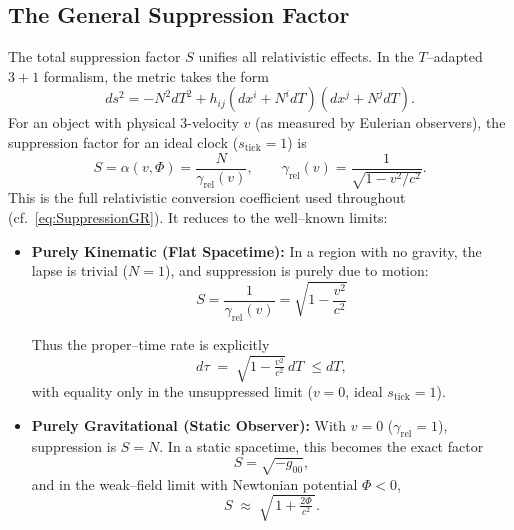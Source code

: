 \documentclass[12pt]{article}
\theoremstyle{plain}
\newcommand{\gammarel}{\gamma_{\!\mathrm{rel}}}
\begin{document}
\subsection{The General Suppression Factor}
The total suppression factor $S$ unifies all relativistic effects. In the $T$–adapted $3{+}1$ formalism, the metric takes the form
\begin{equation}
ds^2 = -N^2 dT^2 + h_{ij}(dx^i + N^i dT)(dx^j + N^j dT).
\label{eq:ADMmetric}
\end{equation}
For an object with physical 3-velocity $v$ (as measured by Eulerian observers), the suppression factor for an ideal clock ($s_{\text{tick}}=1$) is
\begin{equation}
S = \alpha(v,\Phi) = \frac{N}{\gammarel(v)}, 
\qquad \gammarel(v)=\frac{1}{\sqrt{1-v^2/c^2}}.
\label{eq:GeneralSuppression}
\end{equation}
This is the full relativistic conversion coefficient used throughout (cf.~\eqref{eq:SuppressionGR}). It reduces to the well–known limits:
\begin{itemize}
    \item \textbf{Purely Kinematic (Flat Spacetime):} In a region with no gravity, the lapse is trivial ($N=1$), and suppression is purely due to motion:
    \begin{equation}
        S = \frac{1}{\gammarel(v)} = \sqrt{1-\frac{v^2}{c^2}}
        \label{eq:KinematicSuppression}
    \end{equation}
    
    Thus the proper–time rate is explicitly
    \begin{equation}
        d\tau \;=\; \sqrt{1-\tfrac{v^2}{c^2}}\, dT \;\le dT,
        \label{eq:dtauKinematic}
    \end{equation}
    with equality only in the unsuppressed limit ($v=0$, ideal $s_{\mathrm{tick}}=1$).

    \item \textbf{Purely Gravitational (Static Observer):} With $v=0$ ($\gammarel=1$), suppression is $S=N$. In a static spacetime, this becomes the exact factor
    \begin{equation}
        S=\sqrt{-g_{00}},
        \label{eq:SuppressionGR}
    \end{equation}
    and in the weak–field limit with Newtonian potential $\Phi<0$,
    \begin{equation}
        S \;\approx\; \sqrt{\,1+\tfrac{2\Phi}{c^2}\,}.
        \label{eq:SuppressionNewton}
    \end{equation}

\end{itemize}
\end{document}

